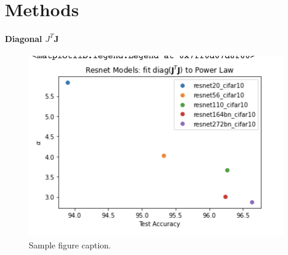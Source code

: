 \section{Methods}
\label{sxn:results}


\paragraph{Diagonal $\mathbf{}J^{T}\mathbf{J}$}
\begin{figure}[h]
\begin{center}
\includegraphics[scale=0.4]{img/JJdiag-alpha.png}
\end{center}
\caption{Sample figure caption.}
\label{fig:JJdiag-alpha}
\end{figure}








